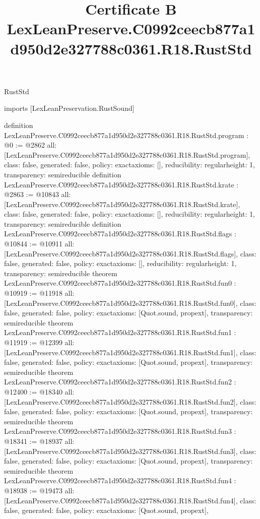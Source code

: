 \begin{lexlean}{RustStd}
\title{Certificate B LexLeanPreserve.C0992ceecb877a1d950d2e327788c0361.R18.RustStd}
\begin{coremodule}
imports [LexLeanPreservation.RustSound]

definition LexLeanPreserve.C0992ceecb877a1d950d2e327788c0361.R18.RustStd.program : @0 := @2862 {
  all: [LexLeanPreserve.C0992ceecb877a1d950d2e327788c0361.R18.RustStd.program],
  class: false,
  generated: false,
  policy: exact{axioms: []},
  reducibility: regular{height: 1},
  transparency: semireducible
}
definition LexLeanPreserve.C0992ceecb877a1d950d2e327788c0361.R18.RustStd.krate : @2863 := @10843 {
  all: [LexLeanPreserve.C0992ceecb877a1d950d2e327788c0361.R18.RustStd.krate],
  class: false,
  generated: false,
  policy: exact{axioms: []},
  reducibility: regular{height: 1},
  transparency: semireducible
}
definition LexLeanPreserve.C0992ceecb877a1d950d2e327788c0361.R18.RustStd.flags : @10844 := @10911 {
  all: [LexLeanPreserve.C0992ceecb877a1d950d2e327788c0361.R18.RustStd.flags],
  class: false,
  generated: false,
  policy: exact{axioms: []},
  reducibility: regular{height: 1},
  transparency: semireducible
}
theorem LexLeanPreserve.C0992ceecb877a1d950d2e327788c0361.R18.RustStd.fun0 : @10919 := @11918 {
  all: [LexLeanPreserve.C0992ceecb877a1d950d2e327788c0361.R18.RustStd.fun0],
  class: false,
  generated: false,
  policy: exact{axioms: [Quot.sound, propext]},
  transparency: semireducible
}
theorem LexLeanPreserve.C0992ceecb877a1d950d2e327788c0361.R18.RustStd.fun1 : @11919 := @12399 {
  all: [LexLeanPreserve.C0992ceecb877a1d950d2e327788c0361.R18.RustStd.fun1],
  class: false,
  generated: false,
  policy: exact{axioms: [Quot.sound, propext]},
  transparency: semireducible
}
theorem LexLeanPreserve.C0992ceecb877a1d950d2e327788c0361.R18.RustStd.fun2 : @12400 := @18340 {
  all: [LexLeanPreserve.C0992ceecb877a1d950d2e327788c0361.R18.RustStd.fun2],
  class: false,
  generated: false,
  policy: exact{axioms: [Quot.sound, propext]},
  transparency: semireducible
}
theorem LexLeanPreserve.C0992ceecb877a1d950d2e327788c0361.R18.RustStd.fun3 : @18341 := @18937 {
  all: [LexLeanPreserve.C0992ceecb877a1d950d2e327788c0361.R18.RustStd.fun3],
  class: false,
  generated: false,
  policy: exact{axioms: [Quot.sound, propext]},
  transparency: semireducible
}
theorem LexLeanPreserve.C0992ceecb877a1d950d2e327788c0361.R18.RustStd.fun4 : @18938 := @19473 {
  all: [LexLeanPreserve.C0992ceecb877a1d950d2e327788c0361.R18.RustStd.fun4],
  class: false,
  generated: false,
  policy: exact{axioms: [Quot.sound, propext]},
}
\end{coremodule}
\end{lexlean}

